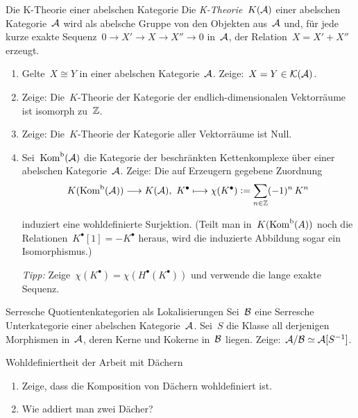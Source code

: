 \documentclass{uebblatt}
\begin{document}
\begin{aufgabe}{Die K-Theorie einer abelschen Kategorie}
Die \emph{K-Theorie}~$K(\mathcal{A})$ einer abelschen Kategorie~$\mathcal{A}$ wird als abelsche
Gruppe von den Objekten aus~$\mathcal{A}$ und, für jede kurze exakte
Sequenz~$0 \to X' \to X \to X'' \to 0$ in~$\mathcal{A}$, der Relation~$X = X' + X''$ erzeugt.

\begin{enumerate}
\item Gelte~$X \cong Y$ in einer abelschen Kategorie~$\mathcal{A}$. Zeige:~$X = Y \in \mathcal{K}(\mathcal{A})$.
\item Zeige: Die~$K$-Theorie der Kategorie der endlich-dimensionalen Vektorräume
ist isomorph zu~$\mathbb{Z}$.
\item Zeige: Die~$K$-Theorie der Kategorie aller Vektorräume ist Null.
\item Sei~$\mathrm{Kom}^\mathrm{b}(\mathcal{A})$ die Kategorie der beschränkten Kettenkomplexe über einer
abelschen Kategorie~$\mathcal{A}$. Zeige: Die auf Erzeugern gegebene Zuordnung
\[ K(\mathrm{Kom}^\mathrm{b}(\mathcal{A})) \longrightarrow K(\mathcal{A}),\ K^\bullet \longmapsto
  \chi(K^\bullet) \vcentcolon= \sum_{n \in \mathbb{Z}} (-1)^n \, K^n \]
\vspace{-1.5em}

induziert eine wohldefinierte Surjektion.
(Teilt man in~$K(\mathrm{Kom}^\mathrm{b}(A))$ noch die Relationen~$K^\bullet[1] =
-K^\bullet$ heraus, wird die induzierte Abbildung sogar ein Isomorphismus.)

\emph{Tipp:} Zeige~$\chi(K^\bullet) = \chi(H^\bullet(K^\bullet))$ und verwende
die lange exakte Sequenz.
\end{enumerate}
\end{aufgabe}

\enlargethispage{1em}

\begin{aufgabe}{Serresche Quotientenkategorien als Lokalisierungen}
Sei~$\mathcal{B}$ eine Serresche Unterkategorie einer abelschen Kategorie~$\mathcal{A}$. Sei~$S$
die Klasse all derjenigen Morphismen in~$\mathcal{A}$, deren Kerne und Kokerne in~$\mathcal{B}$
liegen. Zeige:~$\mathcal{A}/\mathcal{B} \simeq \mathcal{A}[S^{-1}]$.
\end{aufgabe}
\vspace{-1em}

\begin{aufgabe}{Wohldefiniertheit der Arbeit mit Dächern}
\begin{enumerate}
\item Zeige, dass die Komposition von Dächern wohldefiniert ist.
\item Wie addiert man zwei Dächer?
\end{enumerate}
\end{aufgabe}
\end{document}

